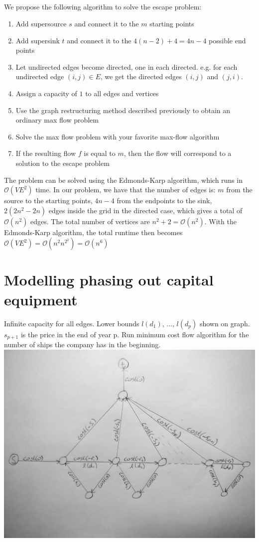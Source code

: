 \documentclass[a4paper]{article}
\begin{document}
\subsection{}
We propose the following algorithm to solve the escape problem:
\begin{enumerate}
  \item Add supersource $s$ and connect it to the $m$ starting points
  \item Add supersink $t$ and connect it to the $4(n-2)+4=4n-4$ possible end points
  \item Let undirected edges become directed, one in each directed. e.g. for each undirected edge $(i,j)\in E$, we get the directed edges $(i,j)$ and $(j,i)$.
  \item Assign a capacity of $1$ to all edges and vertices
  \item Use the graph restructuring method described previously to obtain an ordinary max flow problem
  \item Solve the max flow problem with your favorite max-flow algorithm
  \item If the resulting flow $f$ is equal to $m$, then the flow will correspond to a solution to the escape problem
\end{enumerate}
The problem can be solved using the Edmonds-Karp algorithm, which runs in $\mathcal{O}(VE^2)$ time. In our problem, we have that the number of edges is: $m$ from the source to the starting points, $4n-4$ from the endpoints to the sink, $2(2n^2-2n)$ edges inside the grid in the directed case, which gives a total of $\mathcal{O}(n^2)$ edges. The total number of vertices are $n^2+2=\mathcal{O}(n^2)$. With the Edmonds-Karp algorithm, the total runtime then becomes
$\mathcal{O}(VE^2)=\mathcal{O}(n^2n^{2^2})=\mathcal{O}(n^6)$
\section{Modelling phasing out capital equipment}
Infinite capacity for all edges. Lower bounds $l(d_1)$, ..., $l(d_p)$ shown on graph. $s_{p+1}$ is the price in the end of year p. Run minimum cost flow algorithm for the number of ships the company has in the beginning.\\
\includegraphics[width=\textwidth]{nr5graph}
\end{document}
